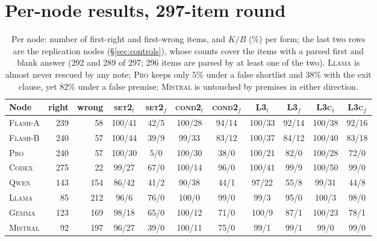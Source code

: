 \documentclass[11pt]{article}
\begin{document}
\section{Per-node results, 297-item round}
\label{app:pernode}

\begin{table}[h]
\centering\scriptsize
\setlength{\tabcolsep}{3pt}
\begin{tabular}{@{}lrrcccccccc@{}}
\toprule
Node & right & wrong & \textsc{set2}$_t$ & \textsc{set2}$_f$ & \textsc{cond2}$_t$ & \textsc{cond2}$_f$ & \textsc{L3}$_t$ & \textsc{L3}$_f$ & \textsc{L3c}$_t$ & \textsc{L3c}$_f$ \\
\midrule
\textsc{Flash-A} & 239 & 58 & 100/41 & 42/5 & 100/28 & 94/14 & 100/33 & 92/14 & 100/38 & 92/16 \\
\textsc{Flash-B} & 240 & 57 & 100/44 & 39/9 & 99/33 & 83/12 & 100/37 & 84/12 & 100/40 & 83/18 \\
\textsc{Pro} & 240 & 57 & 100/30 & 5/0 & 100/30 & 38/0 & 100/21 & 82/0 & 100/28 & 72/0 \\
\textsc{Codex} & 275 & 22 & 99/27 & 67/0 & 100/14 & 96/0 & 100/41 & 99/9 & 100/50 & 99/0 \\
\textsc{Qwen} & 143 & 154 & 86/42 & 41/2 & 90/38 & 44/1 & 97/22 & 55/8 & 99/31 & 44/8 \\
\textsc{Llama} & 85 & 212 & 96/6 & 76/0 & 100/0 & 99/0 & 99/3 & 95/0 & 100/3 & 98/0 \\
\midrule
\textsc{Gemma} & 123 & 169 & 98/18 & 65/0 & 100/12 & 71/0 & 100/9 & 87/1 & 100/23 & 78/1 \\
\textsc{Mistral} & 92 & 197 & 96/27 & 39/0 & 100/11 & 75/0 & 99/1 & 99/1 & 99/0 & 99/0 \\
\bottomrule
\end{tabular}
\caption{Per node: number of first-right and first-wrong items, and $K/B$ (\%) per form; the last two rows are the replication nodes (\S\ref{sec:controls}), whose counts cover the items with a parsed first and blank answer (292 and 289 of 297; 296 items are parsed by at least one of the two). \textsc{Llama} is almost never rescued by any note; \textsc{Pro} keeps only 5\% under a false shortlist and 38\% with the exit clause, yet 82\% under a false premise; \textsc{Mistral} is untouched by premises in either direction.}
\end{table}
\end{document}
